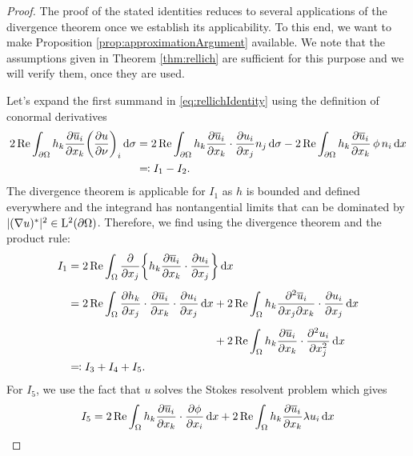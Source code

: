 \begin{proof}
  The proof of the stated identities reduces to several applications of the divergence theorem once we establish its applicability.
  To this end, we want to make Proposition \ref{prop:approximationArgument} available. We note that the assumptions given in Theorem \ref{thm:rellich} are sufficient for this purpose and we will verify them, once they are used.

  Let's expand the first summand in \eqref{eq:rellichIdentity} using the definition of conormal derivatives
  \begin{align*}
    2\operatorname{Re} \int_{\partial\Omega} h_k \frac{\partial \overline u_i}{\partial x_k} \bigg( \frac{\partial u}{\partial \nu} \bigg)_i \, {\operatorname{d}\!{\sigma}}
    &= 2 \operatorname{Re} \int_{\partial\Omega} h_k \frac{\partial \overline u_i}{\partial x_k} \cdot \frac{\partial u_i}{\partial x_j}  n_j \, {\operatorname{d}\!{\sigma}}  - 2\operatorname{Re} \int_{\partial\Omega} h_k \frac{\partial \overline u_i}{\partial x_k} \, \phi\, n_i \, {\operatorname{d}\!{x}} \\
    &\eqqcolon I_1 - I_2.
  \end{align*}
  The divergence theorem is applicable for $I_1$ as $h$ is bounded and defined everywhere and the integrand has nontangential limits that can be dominated by $|(\nabla u)^*|^2 \in \mathrm{L}^2(\partial\Omega)$.
  Therefore, we find using the divergence theorem and the product rule:
  \begin{align*}
    I_1
    &= 2\Ret \int_\Omega \frac{\partial}{\partial x_j} \bigg\{ h_k \frac{\partial \overline u_i}{\partial x_k} \cdot \frac{\partial u_i}{\partial x_j} \bigg\} \d x \\[0.5em]
    &= 2\Ret \int_\Omega \frac{\partial h_k}{\partial x_j} \cdot \frac{\partial \overline u_i}{\partial x_k} \cdot \frac{\partial u_i}{\partial x_j} \d x 
    + 2\Ret \int_{\Omega} h_k \frac{\partial^2 \overline u_i}{\partial x_j \partial x_k} \cdot \frac{\partial u_i}{\partial x_j} \d x  \\[0.5em]
    &\hphantom{= 2\Ret \int_\Omega \frac{\partial h_k}{\partial x_j} \cdot \frac{\partial \overline u_i}{\partial x_k} \cdot \frac{\partial u_i}{\partial x_j} \d x } \;
    + 2 \Ret \int_\Omega h_k \frac{\partial \overline u_i}{\partial x_k} \cdot \frac{\partial^2 u_i}{\partial x_j^2} \d x \\
    &\eqqcolon I_3 + I_4 + I_5.
  \end{align*}
  For $I_5$, we use the fact that $u$ solves the Stokes resolvent problem which gives
  \begin{align*}
     I_5 
     &= 2 \Ret \int_\Omega h_k \frac{\partial \overline u_i}{\partial x_k}\cdot  \frac{\partial \phi}{\partial x_i} \d x + 2\Ret \int_\Omega h_k \frac{\partial\overline u_i}{\partial x_k} \lambda u_i \d x \\

\end{align*}
\end{proof}
